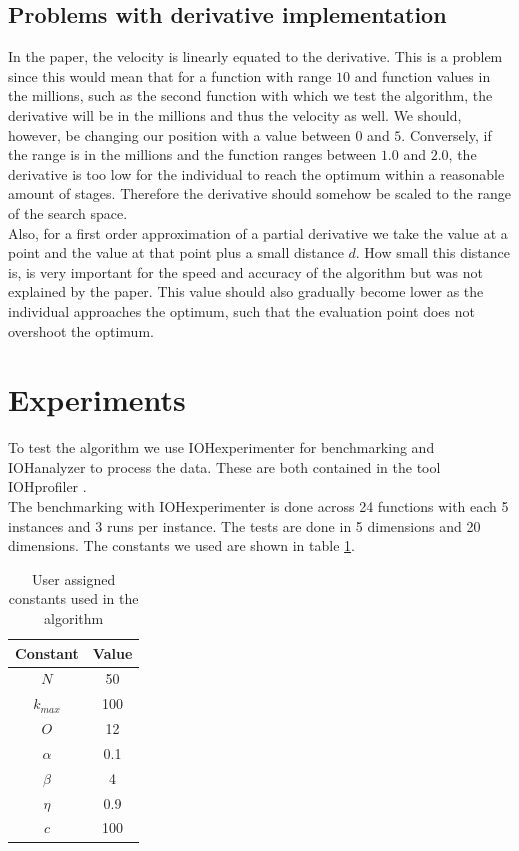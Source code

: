 \documentclass[runningheads]{llncs}
\begin{document}
\subsection{Problems with derivative implementation}
In the paper, the velocity is linearly equated to the derivative. This is a problem since this would mean that for a function with range $10$ and function values in the millions, such as the second function with which we test the algorithm, the derivative will be in the millions and thus the velocity as well. We should, however, be changing our position with a value between $0$ and $5$. Conversely, if the range is in the millions and the function ranges between $1.0$ and $2.0$, the derivative is too low for the individual to reach the optimum within a reasonable amount of stages. Therefore the derivative should somehow be scaled to the range of the search space.\\
Also, for a first order approximation of a partial derivative we take the value at a point and the value at that point plus a small distance $d$. How small this distance is, is very important for the speed and accuracy of the algorithm but was not explained by the paper. This value should also gradually become lower as the individual approaches the optimum, such that the evaluation point does not overshoot the optimum.\\


\section{Experiments}
To test the algorithm we use IOHexperimenter for benchmarking and IOHanalyzer to process the data. These are both contained in the tool IOHprofiler \cite{IOHprofiler}.\\
The benchmarking with IOHexperimenter is done across 24 functions with each 5 instances and 3 runs per instance. The tests are done in 5 dimensions and 20 dimensions. The constants we used are shown in table \ref{tab:constants}.
\begin{table}[h!]
    \centering
    \begin{tabular}{c|c}
        Constant & Value \\ \hline \hline
        $N$ & 50\\\hline
        $k_{max}$ & 100\\\hline
        $O$ & 12 \\\hline
        $\alpha$ & 0.1 \\\hline
        $\beta$ & 4 \\\hline
        $\eta$ & 0.9\\\hline
        $c$ & 100
        \end{tabular}
    \caption{User assigned constants used in the algorithm}
    \label{tab:constants}
\end{table}{}
\end{document}
